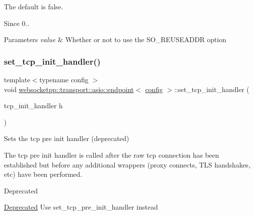 The default is false.

\begin{DoxySince}{Since}
0..
\end{DoxySince}

\begin{DoxyParams}{Parameters}
{\em value} & Whether or not to use the S\+O\+\_\+\+R\+E\+U\+S\+E\+A\+D\+DR option \\
\hline
\end{DoxyParams}
\mbox{\label{classwebsocketpp_1_1transport_1_1asio_1_1endpoint_a497f353a5ec277355cd8b0caf893d1ce}} 
\subsubsection{\texorpdfstring{set\+\_\+tcp\+\_\+init\+\_\+handler()}{set\_tcp\_init\_handler()}}
{\footnotesize\ttfamily template$<$typename config $>$ \\
void \mbox{\hyperlink{classwebsocketpp_1_1transport_1_1asio_1_1endpoint}{websocketpp\+::transport\+::asio\+::endpoint}}$<$ \mbox{\hyperlink{classconfig}{config}} $>$\+::set\+\_\+tcp\+\_\+init\+\_\+handler (\begin{DoxyParamCaption}\item[{tcp\+\_\+init\+\_\+handler}]{h }\end{DoxyParamCaption})\hspace{0.3cm}{\ttfamily [inline]}}



Sets the tcp pre init handler (deprecated) 

The tcp pre init handler is called after the raw tcp connection has been established but before any additional wrappers (proxy connects, T\+LS handshakes, etc) have been performed.

\begin{DoxyRefDesc}{Deprecated}
\item[\mbox{\hyperlink{deprecated__deprecated000003}{Deprecated}}]Use set\+\_\+tcp\+\_\+pre\+\_\+init\+\_\+handler instead\end{DoxyRefDesc}



